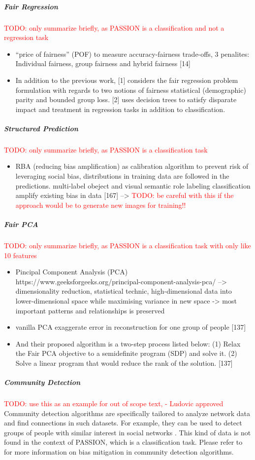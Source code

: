 \documentclass[12pt, a4paper, oneside]{book}   	%
\renewcommand{\todo}[1]{\textcolor{red}{TODO: #1}}
\begin{document}
			\subparagraph{Fair Regression}
				\todo{only summarize briefly, as PASSION is a classification and not a regression task}
				\begin{itemize}
					\item “price of fairness” (POF) to measure accuracy-fairness trade-offs, 3 penalites: Individual fairness, group fairness and hybrid fairness [14] \autocite{Mehrabi_2021}
					\item In addition to the previous work, [1] considers the fair regression problem formulation with regards to two notions of fairness statistical (demographic) parity and bounded group loss. [2] uses decision trees to satisfy disparate impact and treatment in regression tasks in addition to classification. \autocite{Mehrabi_2021}
				\end{itemize}
			\subparagraph{Structured Prediction}
				\todo{only summarize briefly, as PASSION is a classification task}
				\begin{itemize}
					\item RBA (reducing bias amplification) as calibration algorithm to prevent risk of leveraging social bias, distributions in training data are followed in the predictions. multi-label obeject and visual semantic role labeling classification amplify existing bias in data [167] \autocite{Mehrabi_2021} --> \todo{be careful with this if the approach would be to generate new images for training!!}
				\end{itemize}
			\subparagraph{Fair PCA}
				\todo{only summarize briefly, as PASSION is a classification task with only like 10 features}
				\begin{itemize}
					\item Pincipal Component Analysis (PCA) https://www.geeksforgeeks.org/principal-component-analysis-pca/ --> dimensionality reduction, statistical technic, high-dimensional data into lower-dimensional space while maximising variance in new space -> most important patterns and relationships is preserved
					\item vanilla PCA exaggerate error in reconstruction for one group of people [137] \autocite{Mehrabi_2021}
					\item And their proposed algorithm is a two-step process listed below: (1) Relax the Fair PCA objective to a semidefinite program (SDP) and solve it. (2) Solve a linear program that would reduce the rank of the solution. [137] \autocite{Mehrabi_2021}
				\end{itemize}
			\subparagraph{Community Detection}
				\todo{use this as an example for out of scope text, - Ludovic approved}
				Community detection algorithms are specifically tailored to analyze network data and find connections in such datasets. For example, they can be used to detect groups of people with similar interest in social networks \autocite{Jayawickrama_2021}. This kind of data is not found in the context of PASSION, which is a classification task. Please refer to \cite{Mehrabi_2021} for more information on bias mitigation in community detection algorithms.
				
\end{document}
